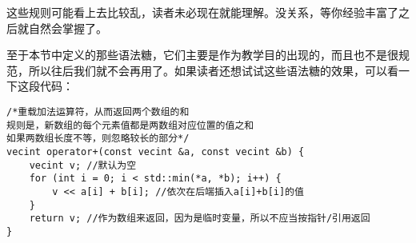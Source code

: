 这些规则可能看上去比较乱，读者未必现在就能理解。没关系，等你经验丰富了之后就自然会掌握了。\par
至于本节中定义的那些语法糖，它们主要是作为教学目的出现的，而且也不是很规范，所以往后我们就不会再用了。如果读者还想试试这些语法糖的效果，可以看一下这段代码：
\begin{lstlisting}
/*重载加法运算符，从而返回两个数组的和
规则是，新数组的每个元素值都是两数组对应位置的值之和
如果两数组长度不等，则忽略较长的部分*/
vecint operator+(const vecint &a, const vecint &b) {
    vecint v; //默认为空
    for (int i = 0; i < std::min(*a, *b); i++) {
        v << a[i] + b[i]; //依次在后端插入a[i]+b[i]的值
    }
    return v; //作为数组来返回，因为是临时变量，所以不应当按指针/引用返回
}
\end{lstlisting}\par
